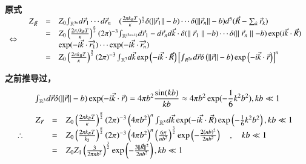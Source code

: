 \documentclass{article} %
\begin{document}
\noindent 
{\bf 原式$\begin{array}{cc} {\Leftrightarrow } & {\begin{array}{rcl} {Z{}_{\vec{R}} } & {=} & {Z_{0} {\mathop{\smallint }\nolimits_{\mathrm{{\mathbb R}}^{3n} }} d\vec{r}_{1} \cdots d\vec{r}_{n} \quad (\frac{2\pi k_{B} T}{\kappa } )^{\frac{n}{2} } \delta (||\vec{r}_{1} ||-b)\cdots \delta (||\vec{r}_{n} ||-b)d^{5} (\vec{R}-\sum _{k}\vec{r}_{k}  )} \\ {} & {=} & {Z_{0} \left(\frac{2\pi /k_{B} T}{\kappa } \right)^{\frac{n}{2} } (2\pi )^{-3} {\mathop{\smallint }\nolimits_{\mathrm{{\mathbb R}}^{(3n+1)} }} d\vec{r}_{1} -d\vec{r}_{n} d\vec{k}\cdot \delta (\parallel \vec{r}_{1} \parallel -b)\cdots \delta (\parallel \vec{r}_{n} \parallel -b)\exp (i\vec{k}\cdot \vec{R})} \\ {} & {} & {\exp (-i\vec{k}\cdot \overrightarrow{r_{1} })\cdots \exp (-i\vec{k}\cdot \overrightarrow{r_{n} })} \\ {} & {=} & {Z_{0} \left(\frac{2\pi k_{B} T}{\kappa } \right)^{\frac{n}{2} } \left(2\pi \right)^{-3} {\mathop{\smallint }\nolimits_{\mathrm{{\mathbb R}}^{3} }} d\vec{k}\exp \left(-i\vec{k}\cdot \vec{R}\right)\left[{\mathop{\smallint }\nolimits_{R^{2n} }} d\vec{r}\delta \left(||\vec{r}||-b\right)\exp \left(-i\vec{k}\cdot \vec{r}\right)\right]^{n} } \end{array}} \end{array}$ }

\noindent 
{\bf 之前推导过，
\[{\mathop{\smallint }\nolimits_{\mathrm{{\mathbb R}}^{3} }} d\vec{r}\delta (||\vec{r}||-b)\exp (-i\vec{k}\cdot \vec{r})=4\pi b^{2} \frac{\sin (kb)}{kb} \approx 4\pi b^{2} \exp (-\frac{1}{6} k^{2} b^{2} ),kb\ll 1\] 
\[\begin{array}{cc} {\therefore } & {\begin{array}{rcl} {Z{}_{\vec{r}} } & {=} & {Z_{0} \left(\frac{2\pi k_{B} T}{\kappa } \right)^{\frac{n}{2} } (2\pi )^{-3} \left(4\pi b^{2} \right)^{n} {\mathop{\smallint }\nolimits_{\mathrm{{\mathbb R}}^{3} }} d\vec{k}\exp (-i\vec{k}\cdot \vec{R})\exp \left(-\frac{1}{6} k^{2} b^{2} \right),kb\ll 1} \\ {} & {=} & {Z_{0} \left(\frac{2\pi k_{B} T}{k_{5} } \right)^{\frac{n}{2} } (2\pi )^{-3} \left(4\pi b^{2} \right)^{n} \left(\frac{6\pi }{nb^{2} } \right)^{\frac{3}{2} } \exp \left(-\frac{2(nb)^{2} }{2nb^{2} } \right)\quad ,\quad kb\ll 1} \\ {} & {=} & {Z_{0} Z_{1} \left(\frac{3}{2\pi nb^{2} } \right)^{\frac{3}{2} } \exp \left(-\frac{3\parallel \vec{R}\parallel ^{2} }{2nb^{2} } \right),kb\ll 1} \end{array}} \end{array}\] }
\end{document}
